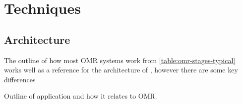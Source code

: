 \chapter{Techniques}
\label{sec:techniques}

\section{Architecture}

The outline of how most OMR systems work from \cref{table:omr-stages-typical} works well as a reference for the architecture of \noteED, however there are some key differences 

Outline of application and how it relates to OMR.




\clearpage

